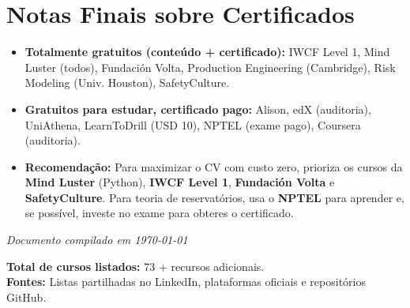 \documentclass[11pt,a4paper]{article}
\begin{document}
\section*{Notas Finais sobre Certificados}
\begin{itemize}[leftmargin=*]
    \item \textbf{Totalmente gratuitos (conteúdo + certificado):} IWCF Level 1, Mind Luster (todos), Fundación Volta, Production Engineering (Cambridge), Risk Modeling (Univ. Houston), SafetyCulture.
    \item \textbf{Gratuitos para estudar, certificado pago:} Alison, edX (auditoria), UniAthena, LearnToDrill (USD 10), NPTEL (exame pago), Coursera (auditoria).
    \item \textbf{Recomendação:} Para maximizar o CV com custo zero, prioriza os cursos da \textbf{Mind Luster} (Python), \textbf{IWCF Level 1}, \textbf{Fundación Volta} e \textbf{SafetyCulture}. Para teoria de reservatórios, usa o \textbf{NPTEL} para aprender e, se possível, investe no exame para obteres o certificado.
\end{itemize}

\vspace{1em}
\begin{center}
    \textit{Documento compilado em \today}
\end{center}

\textbf{Total de cursos listados:} 73 + recursos adicionais.\\
\textbf{Fontes:} Listas partilhadas no LinkedIn, plataformas oficiais e repositórios GitHub.
\end{document}
